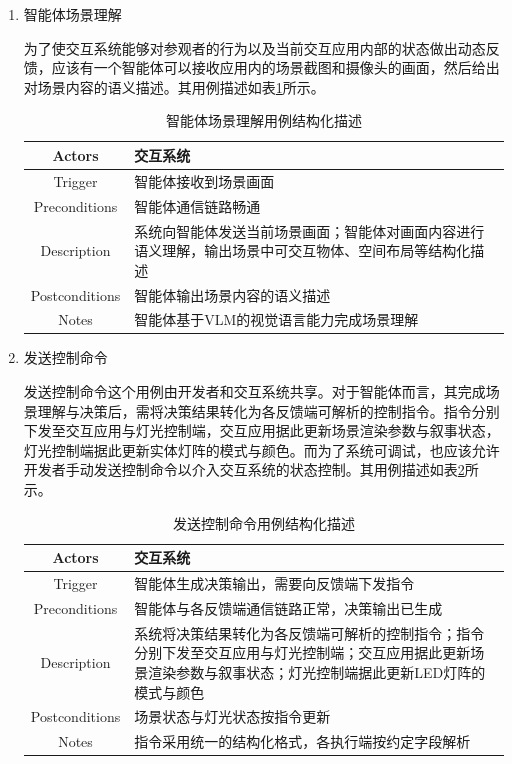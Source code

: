 \documentclass[bachelor]{njupthesis}
\begin{document}
\begin{enumerate}
\item 智能体场景理解

为了使交互系统能够对参观者的行为以及当前交互应用内部的状态做出动态反馈，应该有一个智能体可以接收应用内的场景截图和摄像头的画面，然后给出对场景内容的语义描述。其用例描述如表\ref{tbl:usecase-understanding}所示。

\begin{table}[h]
\centering
\caption{智能体场景理解用例结构化描述}
\begin{tabularx}{\linewidth}{cX}
\toprule
Actors & 交互系统 \\
\midrule
Trigger & 智能体接收到场景画面 \\
Preconditions & 智能体通信链路畅通 \\
Description & 系统向智能体发送当前场景画面；智能体对画面内容进行语义理解，输出场景中可交互物体、空间布局等结构化描述 \\
Postconditions & 智能体输出场景内容的语义描述 \\
Notes & 智能体基于VLM的视觉语言能力完成场景理解 \\
\bottomrule
\end{tabularx}
\label{tbl:usecase-understanding}
\end{table}

\item 发送控制命令

发送控制命令这个用例由开发者和交互系统共享。对于智能体而言，其完成场景理解与决策后，需将决策结果转化为各反馈端可解析的控制指令。指令分别下发至交互应用与灯光控制端，交互应用据此更新场景渲染参数与叙事状态，灯光控制端据此更新实体灯阵的模式与颜色。而为了系统可调试，也应该允许开发者手动发送控制命令以介入交互系统的状态控制。其用例描述如表\ref{tbl:usecase-command}所示。

\begin{table}[h]
\centering
\caption{发送控制命令用例结构化描述}
\begin{tabularx}{\linewidth}{cX}
\toprule
Actors & 交互系统 \\
\midrule
Trigger & 智能体生成决策输出，需要向反馈端下发指令 \\
Preconditions & 智能体与各反馈端通信链路正常，决策输出已生成 \\
Description & 系统将决策结果转化为各反馈端可解析的控制指令；指令分别下发至交互应用与灯光控制端；交互应用据此更新场景渲染参数与叙事状态；灯光控制端据此更新LED灯阵的模式与颜色 \\
Postconditions & 场景状态与灯光状态按指令更新 \\
Notes & 指令采用统一的结构化格式，各执行端按约定字段解析 \\
\bottomrule
\end{tabularx}
\label{tbl:usecase-command}
\end{table}


\end{enumerate}
\end{document}
